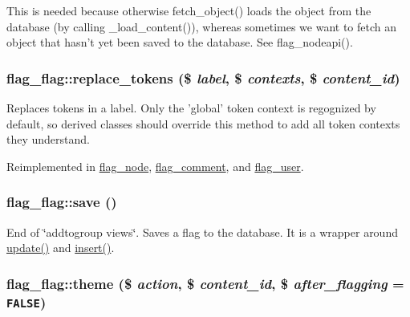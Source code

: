 This is needed because otherwise fetch\_\-object() loads the object from the database (by calling \_\-load\_\-content()), whereas sometimes we want to fetch an object that hasn't yet been saved to the database. See flag\_\-nodeapi(). \hypertarget{classflag__flag_6fa61cada1cb5f94c64b3037fdd28da1}{
\subsubsection[{replace\_\-tokens}]{\setlength{\rightskip}{0pt plus 5cm}flag\_\-flag::replace\_\-tokens (\$ {\em label}, \/  \$ {\em contexts}, \/  \$ {\em content\_\-id})}}
\label{classflag__flag_6fa61cada1cb5f94c64b3037fdd28da1}


Replaces tokens in a label. Only the 'global' token context is regognized by default, so derived classes should override this method to add all token contexts they understand. 

Reimplemented in \hyperlink{classflag__node_38932e35c8b4b0191a118ffde9c27d97}{flag\_\-node}, \hyperlink{classflag__comment_6dc6170aac5518de159741316a38e6bf}{flag\_\-comment}, and \hyperlink{classflag__user_7f311816450a6101d5ea132a41016d51}{flag\_\-user}.\hypertarget{classflag__flag_675d03274caed0ba6b3ecbb87f23f96b}{
\subsubsection[{save}]{\setlength{\rightskip}{0pt plus 5cm}flag\_\-flag::save ()}}
\label{classflag__flag_675d03274caed0ba6b3ecbb87f23f96b}


End of \char`\"{}addtogroup views\char`\"{}. Saves a flag to the database. It is a wrapper around \hyperlink{classflag__flag_c3b0083e0f201ea33788d82dd66fdffd}{update()} and \hyperlink{classflag__flag_47d722a33b88e7e89c2bdf25651d665a}{insert()}. \hypertarget{classflag__flag_9f4c89ddd687305a3bf2ff7755b46b72}{
\subsubsection[{theme}]{\setlength{\rightskip}{0pt plus 5cm}flag\_\-flag::theme (\$ {\em action}, \/  \$ {\em content\_\-id}, \/  \$ {\em after\_\-flagging} = {\tt FALSE})}}
\label{classflag__flag_9f4c89ddd687305a3bf2ff7755b46b72}


